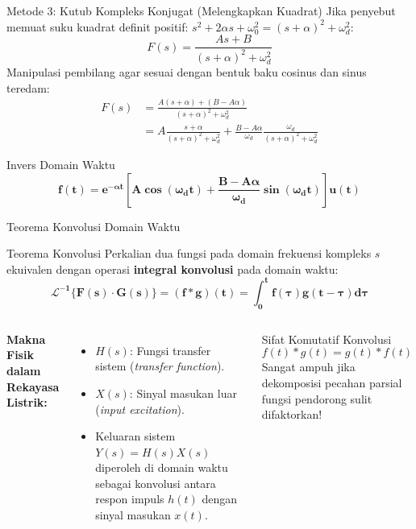 \documentclass[aspectratio=169,10pt]{beamer}
\begin{document}
\begin{frame}{Metode 3: Kutub Kompleks Konjugat (Melengkapkan Kuadrat)}
  Jika penyebut memuat suku kuadrat definit positif: $s^2 + 2\alpha s + \omega_0^2 = (s + \alpha)^2 + \omega_d^2$:
  \begin{equation}
    F(s) = \frac{A s + B}{(s + \alpha)^2 + \omega_d^2}
  \end{equation}
  Manipulasi pembilang agar sesuai dengan bentuk baku cosinus dan sinus teredam:
  \begin{align*}
    F(s) &= \frac{A(s + \alpha) + (B - A\alpha)}{(s + \alpha)^2 + \omega_d^2} \\
         &= A \frac{s + \alpha}{(s + \alpha)^2 + \omega_d^2} + \frac{B - A\alpha}{\omega_d} \frac{\omega_d}{(s + \alpha)^2 + \omega_d^2}
  \end{align*}
  \begin{exampleblock}{Invers Domain Waktu}
    \begin{equation*}
      \mathbf{f(t) = e^{-\alpha t} \left[ A \cos(\omega_d t) + \frac{B - A\alpha}{\omega_d} \sin(\omega_d t) \right] u(t)}
    \end{equation*}
  \end{exampleblock}
\end{frame}

\begin{frame}{Teorema Konvolusi Domain Waktu}
  \begin{block}{Teorema Konvolusi}
    Perkalian dua fungsi pada domain frekuensi kompleks $s$ ekuivalen dengan operasi \textbf{integral konvolusi} pada domain waktu:
    \begin{equation}
      \mathbf{\mathcal{L}^{-1}\{F(s) \cdot G(s)\} = (f * g)(t) = \int_0^t f(\tau) g(t - \tau) d\tau}
    \end{equation}
  \end{block}
  \vspace{0.15cm}
  \begin{columns}[c]
    \textbf{Makna Fisik dalam Rekayasa Listrik:}
    \begin{itemize}
      \item $H(s)$: Fungsi transfer sistem (\textit{transfer function}).
      \item $X(s)$: Sinyal masukan luar (\textit{input excitation}).
      \item Keluaran sistem $Y(s) = H(s) X(s)$ diperoleh di domain waktu sebagai konvolusi antara respon impuls $h(t)$ dengan sinyal masukan $x(t)$.
    \end{itemize}

    \begin{alertblock}{Sifat Komutatif Konvolusi}
      \begin{equation*}
        f(t) * g(t) = g(t) * f(t)
      \end{equation*}
      Sangat ampuh jika dekomposisi pecahan parsial fungsi pendorong sulit difaktorkan!
    \end{alertblock}
  \end{columns}
\end{frame}
\end{document}
